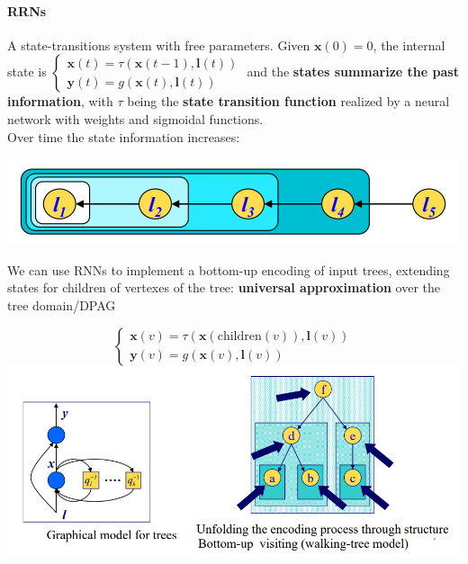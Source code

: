 \documentclass[10pt]{report}
\begin{document}
\paragraph{RRNs} A state-transitions system with free parameters. Given $\mathbf{x}(0) = 0$, the internal state is $\left\{\begin{array}{l}
\mathbf{x}(t)=\tau(\mathbf{x}(t-1),\mathbf{l}(t))\\
\mathbf{y}(t)=g(\mathbf{x}(t),\mathbf{l}(t))
\end{array}\right.$ and the \textbf{states summarize the past information}, with $\tau$ being the \textbf{state transition function} realized by a neural network with weights and sigmoidal functions.\\
Over time the state information increases:
\begin{center}
	\includegraphics[scale=0.75]{41.png}
\end{center}
We can use RNNs to implement a bottom-up encoding of input trees, extending states for children of vertexes of the tree: \textbf{universal approximation} over the tree domain/DPAG
\begin{center}
	$$\left\{\begin{array}{l}
\mathbf{x}(v)=\tau(\mathbf{x}(\text{children}(v)),\mathbf{l}(v))\\
\mathbf{y}(v)=g(\mathbf{x}(v),\mathbf{l}(v))
\end{array}\right.$$
	\includegraphics[scale=0.7]{42.png}
\end{center}
\end{document}
